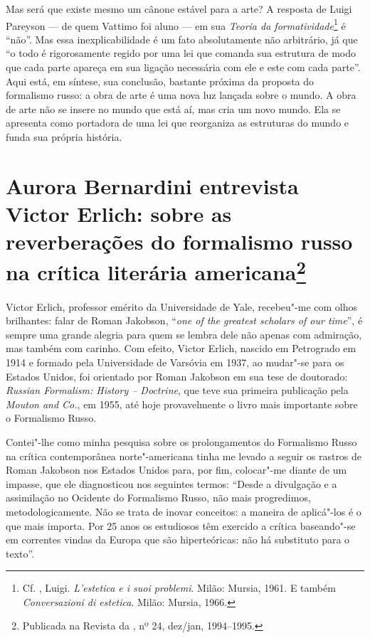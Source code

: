 Mas será que existe mesmo um cânone estável para a arte? A resposta de
Luigi Pareyson --- de quem Vattimo foi aluno
 --- em sua \emph{Teoria da formatividade}\footnote{Cf. , Luigi. 
\emph{L'estetica e i suoi problemi}. Milão: Mursia,
 1961. E também \emph{Conversazioni di estetica}. Milão: Mursia, 1966.}
 é ``não''. Mas essa inexplicabilidade é
um fato absolutamente não arbitrário, já que ``o todo é rigorosamente
regido por uma lei que comanda sua estrutura de modo que cada parte
apareça em sua ligação necessária com ele e este com cada parte''. Aqui
está, em síntese, sua conclusão, bastante próxima da proposta do
formalismo russo: a obra de arte é uma nova luz lançada sobre o mundo. A
obra de arte não se insere no mundo que está aí, mas cria um novo mundo.
Ela se apresenta como portadora de uma lei que reorganiza as estruturas
do mundo e funda sua própria história.

\chapter*{Aurora Bernardini entrevista Victor Erlich: sobre as reverberações do formalismo russo na crítica literária americana\footnote{Publicada na Revista da {}, nº 24, dez/jan, 1994--1995.}}


Victor Erlich, professor emérito da Universidade de Yale, recebeu"-me com
olhos brilhantes: falar de Roman Jakobson, ``\emph{one of the greatest
scholars of our time}'', é sempre uma grande alegria para quem se lembra
dele não apenas com admiração, mas também com carinho.
Com efeito, Victor Erlich, nascido em Petrogrado em 1914 e formado pela
Universidade de Varsóvia em 1937, ao mudar"-se para os Estados Unidos, foi
orientado por Roman Jakobson em sua tese de doutorado: \emph{Russian
Formalism: History -- Doctrine}, que teve sua primeira publicação
pela \emph{Mouton and Co.}, em 1955, até hoje provavelmente o livro
mais importante sobre o Formalismo Russo.

Contei"-lhe como minha pesquisa sobre os prolongamentos do Formalismo
Russo na crítica contemporânea norte"-americana tinha me levado
 a seguir os rastros de Roman Jakobson nos Estados Unidos para,
por fim, colocar"-me diante de um impasse, que ele diagnosticou nos seguintes
termos: ``Desde a divulgação e a assimilação no Ocidente do Formalismo
Russo, não mais progredimos, metodologicamente. Não se trata de inovar
conceitos: a maneira de aplicá"-los é o que mais importa. Por 25 anos os
estudiosos têm exercido a crítica baseando"-se em correntes vindas da
Europa que são hiperteóricas: não há substituto para o texto''.

